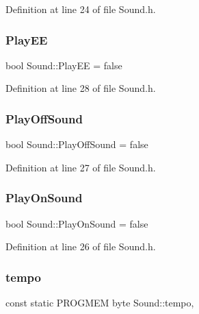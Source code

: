 Definition at line 24 of file Sound.\+h.

\mbox{\label{class_sound_ac7a3280d002f67188a199829e089f5f4}} 
\subsubsection{\texorpdfstring{Play\+EE}{PlayEE}}
{\footnotesize\ttfamily bool Sound\+::\+Play\+EE = false\hspace{0.3cm}{\ttfamily [protected]}}



Definition at line 28 of file Sound.\+h.

\mbox{\label{class_sound_a02a8c493337336014ba0395bdae5c4a8}} 
\subsubsection{\texorpdfstring{Play\+Off\+Sound}{PlayOffSound}}
{\footnotesize\ttfamily bool Sound\+::\+Play\+Off\+Sound = false\hspace{0.3cm}{\ttfamily [protected]}}



Definition at line 27 of file Sound.\+h.

\mbox{\label{class_sound_a2e4c00d9fc63a08a193a741fffe896ca}} 
\subsubsection{\texorpdfstring{Play\+On\+Sound}{PlayOnSound}}
{\footnotesize\ttfamily bool Sound\+::\+Play\+On\+Sound = false\hspace{0.3cm}{\ttfamily [protected]}}



Definition at line 26 of file Sound.\+h.

\mbox{\label{class_sound_ac0d9d464296a35fbe9624eb69c83f868}} 
\subsubsection{\texorpdfstring{tempo}{tempo}}
{\footnotesize\ttfamily const static P\+R\+O\+G\+M\+EM byte Sound\+::tempo\hspace{0.3cm}{\ttfamily [static]}, {\ttfamily [protected]}}



